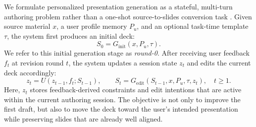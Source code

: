 

We formulate personalized presentation generation as a stateful, multi-turn authoring problem rather than a one-shot source-to-slides conversion task
\citep{sun2021d2s,zheng2025pptagent,zeng2025slidetailor,zheng2026deeppresenter}.
Given source material $x$, a user profile memory $P_u$, and an optional task-time template $\tau$, the system first produces an initial deck:
\begin{equation}
S_0 = G_{\mathrm{init}}(x, P_u, \tau).
\end{equation}
We refer to this initial generation stage as \emph{round-0}. After receiving user feedback $f_t$ at revision round $t$, the system updates a session state
$z_t$ and edits the current deck accordingly:
\begin{equation}
z_t = U(z_{t-1}, f_t; S_{t-1}), \qquad
S_t = G_{\mathrm{edit}}(S_{t-1}, x, P_u, \tau, z_t), \quad t \ge 1.
\end{equation}
Here, $z_t$ stores feedback-derived constraints and edit intentions that are active within the current authoring session. The objective is not only to improve the first draft, but also to move the deck toward the user's intended presentation while preserving slides that are already well aligned.

